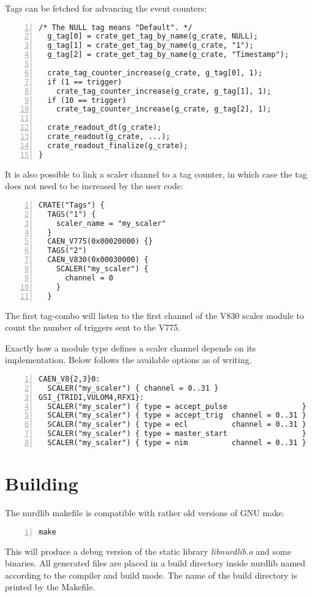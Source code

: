 \documentclass{article}
\begin{document}
Tags can be fetched for advancing the event counters:
\begin{Verbatim}[frame=single,numbers=left]
  /* The NULL tag means "Default". */
  g_tag[0] = crate_get_tag_by_name(g_crate, NULL);
  g_tag[1] = crate_get_tag_by_name(g_crate, "1");
  g_tag[2] = crate_get_tag_by_name(g_crate, "Timestamp");

  crate_tag_counter_increase(g_crate, g_tag[0], 1);
  if (1 == trigger)
    crate_tag_counter_increase(g_crate, g_tag[1], 1);
  if (10 == trigger)
    crate_tag_counter_increase(g_crate, g_tag[2], 1);

  crate_readout_dt(g_crate);
  crate_readout(g_crate, ...);
  crate_readout_finalize(g_crate);
}
\end{Verbatim}

It is also possible to link a scaler channel to a tag counter, in which case
the tag does not need to be increased by the user code:
\begin{Verbatim}[frame=single,numbers=left]
CRATE("Tags") {
  TAGS("1") {
    scaler_name = "my_scaler"
  }
  CAEN_V775(0x00020000) {}
  TAGS("2")
  CAEN_V830(0x00030000) {
    SCALER("my_scaler") {
      channel = 0
    }
  }
\end{Verbatim}
The first tag-combo will listen to the first channel of the V830 scaler module
to count the number of triggers sent to the V775.

Exactly how a module type defines a scaler channel depends on its
implementation. Below follows the available options as of writing.
\begin{Verbatim}[frame=single,numbers=left]
CAEN_V8{2,3}0:
  SCALER("my_scaler") { channel = 0..31 }
GSI_{TRIDI,VULOM4,RFX1}:
  SCALER("my_scaler") { type = accept_pulse                 }
  SCALER("my_scaler") { type = accept_trig  channel = 0..31 }
  SCALER("my_scaler") { type = ecl          channel = 0..31 }
  SCALER("my_scaler") { type = master_start                 }
  SCALER("my_scaler") { type = nim          channel = 0..31 }
\end{Verbatim}




\section{Building}

The nurdlib makefile is compatible with rather old versions of GNU make.
\begin{Verbatim}[frame=single,numbers=left]
make
\end{Verbatim}
This will produce a debug version of the static library \emph{libnurdlib.a}
and some binaries. All generated files are placed in a build directory inside
nurdlib named according to the compiler and build mode. The name of the build
directory is printed by the Makefile.
\end{document}
